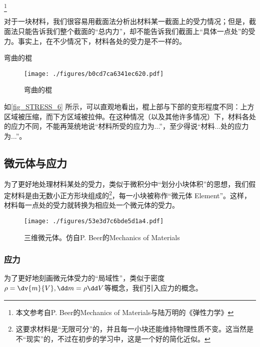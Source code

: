 
\begin{issues}
\issueTODO
\end{issues}

\footnote{本文参考自P. Beer的Mechanics of Materials与陆万明的《弹性力学》}

对于一块材料，我们很容易用截面法分析出材料某一截面上的受力情况；但是，截面法只能告诉我们整个截面的“总内力”，却不能告诉我们截面上“具体一点处”的受力。事实上，在不少情况下，材料各处的受力是不一样的。

\begin{example}{弯曲的棍}
\begin{figure}[ht]
\centering
\texttt{[image: ./figures/b0cd7ca6341ec620.pdf]}
\caption{弯曲的棍} \label{fig_STRESS_6}
\end{figure}
如\autoref{fig_STRESS_6} 所示，可以直观地看出，棍上部与下部的变形程度不同：上方区域被压缩，而下方区域被拉伸。在这种情况（以及其他许多情况）下，材料各处的应力不同，不能再笼统地说“材料所受的应力为...”，至少得说“材料...处的应力为...”。

\end{example}

\subsection{微元体与应力}
为了更好地处理材料某处的受力，类似于微积分中“划分小块体积”的思想，我们假定材料是由无数小正方形块组成的\footnote{这要求材料是“无限可分”的，并且每一小块还能维持物理性质不变。这当然是不“现实”的，不过在初步的学习中，这是一个好的简化近似。}，每一小块被称作“微元体 Element”。这样，材料每一点处的受力就转换为相应处一个微元体的受力。

\begin{figure}[ht]
\centering
\texttt{[image: ./figures/53e3d7c6bde5d1a4.pdf]}
\caption{三维微元体。仿自P. Beer的Mechanics of Materials} \label{fig_STRESS_1}
\end{figure}

\subsubsection{应力}

为了更好地刻画微元体受力的“局域性”，类似于密度$\rho=\dv{m}{V}, \dd m = \rho \dd V$等概念，我们引入应力的概念。

